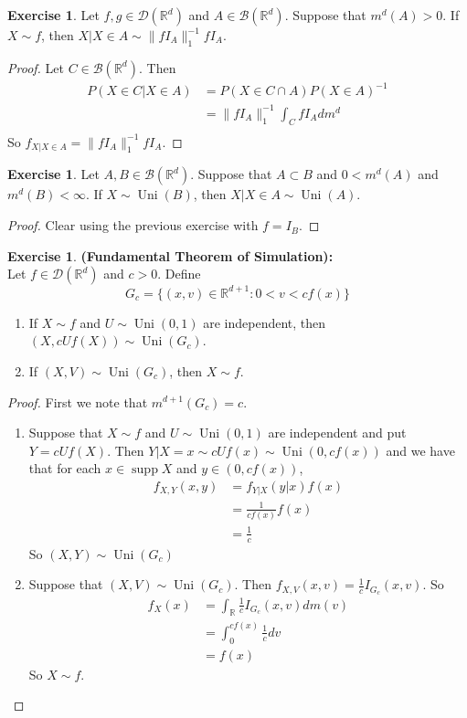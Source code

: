 \documentclass[12pt]{amsart}
\theoremstyle{definition}
\newtheorem{ex}[definition]{Exercise}
\newcommand{\R}{\mathbb{R}}
\newcommand{\MB}{\mathcal{B}}
\newcommand{\MD}{\mathcal{D}}
\DeclareMathOperator{\supp}{supp}
\DeclareMathOperator{\uni}{Uni}
\begin{document}
	\begin{ex}
		Let $f, g \in \MD(\R^d)$ and $A \in \MB(\R^d)$. Suppose that $m^d(A) > 0$. If $X \sim f$, then $X|X \in A \sim \|fI_A\|_1^{-1}fI_A$. 
	\end{ex}

	\begin{proof}
		Let $C \in \MB(\R^d)$. Then
		\begin{align*}
			P(X \in C|X \in A)
			&= P(X \in C \cap A) P(X \in A)^{-1} \\
			&= \|fI_A\|_1^{-1} \int_C fI_A dm^d \\
		\end{align*}
		So $f_{X|X \in A} = \|fI_A\|_1^{-1}fI_A$.
	\end{proof}
	
	\begin{ex}
		Let $A, B \in \MB(\R^d)$. Suppose that $A \subset B$ and $0 < m^d(A)$ and $ m^{d}(B) < \infty$. If $X \sim \uni(B)$, then $X|X \in A \sim \uni(A)$. 
	\end{ex}

	\begin{proof}
		Clear using the previous exercise with $f = I_B$.
	\end{proof}
	
	\begin{ex}\textbf{(Fundamental Theorem of Simulation):} \\
		Let $f \in \MD(\R^d)$ and $c > 0$. Define $$G_c = \{(x,v) \in \R^{d+1}: 0< v < cf(x)\}$$ 
		\begin{enumerate}
			\item If $X \sim f$ and $U \sim \uni(0,1)$  are independent, then $(X, cUf(X)) \sim \uni(G_c)$.
			\item If $(X, V) \sim \uni(G_c)$, then $X \sim f$.
		\end{enumerate}
	\end{ex}

	\begin{proof} First we note that $m^{d+1}(G_c) = c$. 
		\begin{enumerate}
			\item Suppose that $X \sim f$ and $U \sim \uni(0,1)$ are independent and put $Y = cUf(X)$. Then $Y| X= x \sim cUf(x) \sim \uni(0, cf(x))$ and we have that for each $x \in \supp X$ and $y \in (0, cf(x))$,
			\begin{align*}
				f_{X, Y}(x,y) 
				&= f_{Y|X}(y| x) f(x) \\
				&= \frac{1}{c f(x)}f(x) \\
				&= \frac{1}{c}
			\end{align*}
			So $(X, Y) \sim \uni(G_c)$\\
			\item Suppose that $(X, V) \sim \uni(G_c)$. Then $f_{X,V}(x,v) = \frac{1}{c} I_{G_c}(x,v)$. So 
			\begin{align*}
				f_X(x) 
				&= \int_{\R} \frac{1}{c}I_{G_c}(x,v) dm(v) \\ 
				&= \int_{0}^{cf(x)} \frac{1}{c}dv \\
				&= f(x) 
			\end{align*}
			So $X \sim f$.
		\end{enumerate}
	\end{proof}
\end{document}
